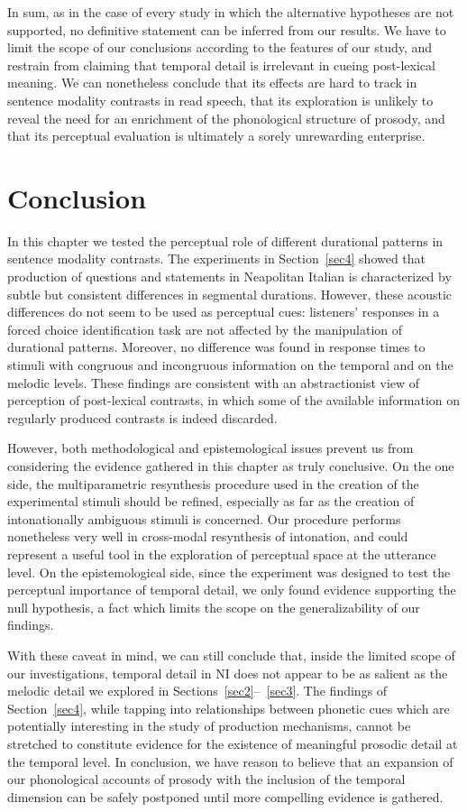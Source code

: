In sum, as in the case of every study in which the alternative hypotheses are not supported, no definitive statement can be inferred from our results. We have to limit the scope of our conclusions according to the features of our study, and restrain from claiming that temporal detail is irrelevant in cueing post-lexical meaning. We can nonetheless conclude that its effects are hard to track in sentence modality contrasts in read speech, that its exploration is unlikely to reveal the need for an enrichment of the phonological structure of prosody, and that its perceptual evaluation is ultimately a sorely unrewarding enterprise.

\section{Conclusion}\label{sec55}
In this chapter we tested the perceptual role of different durational patterns in sentence modality contrasts. The experiments in Section~\ref{sec4} showed that production of questions and statements in Neapolitan Italian is characterized by subtle but consistent differences in segmental durations. However, these acoustic differences do not seem to be used as perceptual cues: listeners' responses in a forced choice identification task are not affected by the manipulation of durational patterns. Moreover, no difference was found in response times to stimuli with congruous and incongruous information on the temporal and on the melodic levels. These findings are consistent with an abstractionist view of perception of post-lexical contrasts, in which some of the available information on regularly produced contrasts is indeed discarded.

However, both methodological and epistemological issues prevent us from considering the evidence gathered in this chapter as truly conclusive. On the one side, the multiparametric resynthesis procedure used in the creation of the experimental stimuli should be refined, especially as far as the creation of intonationally ambiguous stimuli is concerned. Our procedure performs nonetheless very well in cross-modal resynthesis of intonation, and could represent a useful tool in the exploration of perceptual space at the utterance level. On the epistemological side, since the experiment was designed to test the perceptual importance of temporal detail, we only found evidence supporting the null hypothesis, a fact which limits the scope on the generalizability of our findings.

With these caveat in mind, we can still conclude that, inside the limited scope of our investigations, temporal detail in NI does not appear to be as salient as the melodic detail we explored in Sections~\ref{sec2}--~\ref{sec3}. The findings of Section~\ref{sec4}, while tapping into relationships between phonetic cues which are potentially interesting in the study of production mechanisms, cannot be stretched to constitute evidence for the existence of meaningful prosodic detail at the temporal level. In conclusion, we have reason to believe that an expansion of our phonological accounts of prosody with the inclusion of the temporal dimension can be safely postponed until more compelling evidence is gathered.
